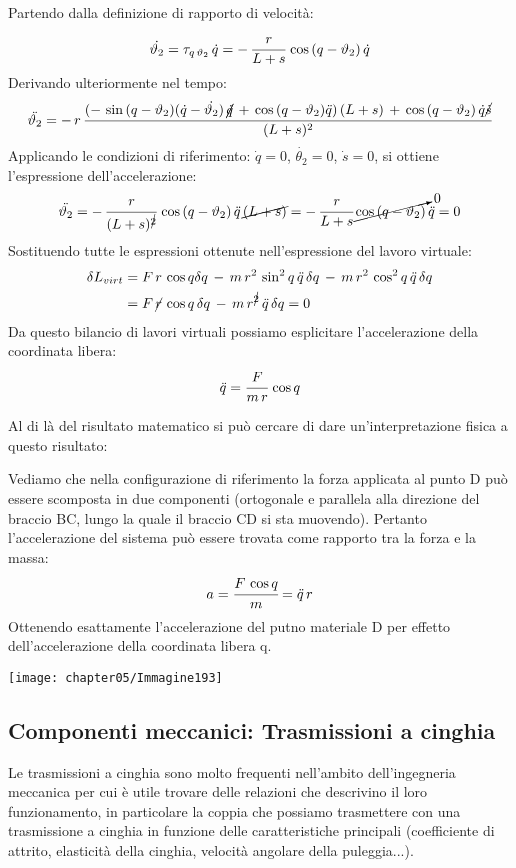 Partendo dalla definizione di rapporto di velocità:
\[\dot{\theta_2} = \tau_{q\,\theta_2}\,\dot{q} = -\,\cfrac{r}{L+s}\,\cos{(q-\theta_2)}\,\dot{q}\]
Derivando ulteriormente nel tempo:
\[\ddot{\theta_2} = -\,r\,\cfrac{(-\,\sin{(q-\theta_2)}(\dot{q}-\dot{\theta_2})\,\cancel{\dot{q}}\,+\,\cos{(q-\theta_2)}\ddot{q})\,(L+s)\,+\,\cos{(q-\theta_2)}\,\dot{q}\cancel{\dot{s}}}{(L+s)^2}\] 
Applicando le condizioni di riferimento: $\dot{q} = 0$, $\dot{\theta_2} = 0$, $\dot{s} = 0$, si ottiene l'espressione dell'accelerazione:
\[\ddot{\theta_2} = -\,\cfrac{r}{(L+s)^{\cancel{2}}}\,\cos{(q-\theta_2)}\,\ddot{q}\,\cancel{(L+s)} = -\,\cfrac{r}{L+s}\,\cancelto{0}{\cos{(q-\theta_2)}}\,\ddot{q} = 0\]
Sostituendo tutte le espressioni ottenute nell'espressione del lavoro virtuale:
\begin{align*}
\delta L_{virt} &= F\,r\,\cos{q} \delta q\,-\,m\,r^2\,\sin^2{q}\,\ddot{q}\,\delta q\,-\,m\,r^2\,\cos^2{q}\,\ddot{q}\,\delta q\\
&= F\,\cancel{r}\,\cos{q}\,\delta q \,-\,m\,r^{\cancel{2}}\,\ddot{q}\,\delta q = 0
\end{align*}
Da questo bilancio di lavori virtuali possiamo esplicitare l'accelerazione della coordinata libera:
\[\ddot{q} = \cfrac{F}{m\,r}\,\cos{q}\]

Al di là  del risultato matematico si può cercare di dare un'interpretazione fisica a questo risultato:

\begin{minipage}{.5\textwidth}
Vediamo che nella configurazione di riferimento la forza applicata al punto D può essere scomposta in due componenti (ortogonale e parallela alla direzione del braccio BC, lungo la quale il braccio CD si sta muovendo). Pertanto l'accelerazione del sistema può essere trovata come rapporto tra la forza e la massa:
\[a = \cfrac{F\,\cos{q}}{m} = \ddot{q}\,r\]
Ottenendo esattamente l'accelerazione del putno materiale D per effetto dell'accelerazione della coordinata libera q.
\end{minipage}
\hfill
\begin{minipage}{.5\textwidth}
\centering
\texttt{[image: chapter05/Immagine193]}
\end{minipage}

\subsection{Componenti meccanici: Trasmissioni a cinghia}

Le trasmissioni a cinghia sono molto frequenti nell'ambito dell'ingegneria meccanica per cui è utile trovare delle relazioni che descrivino il loro funzionamento, in particolare la coppia che possiamo trasmettere con una trasmissione a cinghia in funzione delle caratteristiche principali (coefficiente di attrito, elasticità della cinghia, velocità angolare della puleggia...).

